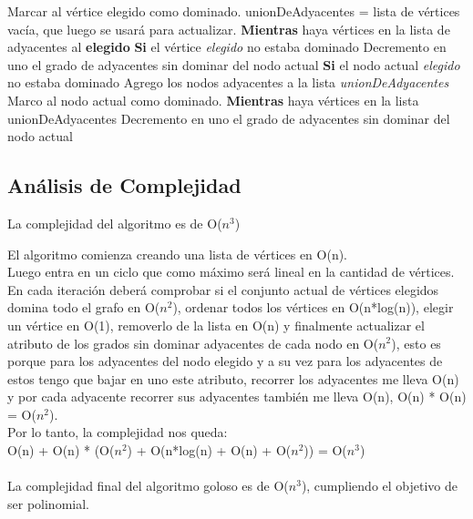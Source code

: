 \begin{codebox}
\li 	Marcar al vértice elegido como dominado.
\li 	unionDeAdyacentes = lista de vértices vacía, que luego se usará para actualizar.
\li 	\textbf{Mientras} haya vértices en la lista de adyacentes al \textbf{elegido} \Do
\li 		\textbf{Si} el vértice \textit{elegido} no estaba dominado \Do
\li 			Decremento en uno el grado de adyacentes sin dominar del nodo actual \End
\li 		\textbf{Si} el nodo actual \textit{elegido} no estaba dominado \Do
\li 			Agrego los nodos adyacentes a la lista \textit{unionDeAdyacentes} \End
\li 		Marco al nodo actual como dominado. \End
\li 	\textbf{Mientras} haya vértices en la lista unionDeAdyacentes \Do 
\li 			Decremento en uno el grado de adyacentes sin dominar del nodo actual \End %
\end{codebox}

\subsection{Análisis de Complejidad}

La complejidad del algoritmo es de O($n^3$)

El algoritmo comienza creando una lista de vértices en O(n).\\
Luego entra en un ciclo que como máximo será lineal en la cantidad de vértices. En cada iteración deberá comprobar si el conjunto actual de vértices elegidos domina todo el grafo en O($n^2$), ordenar todos los vértices en O(n*log(n)), elegir un vértice en O(1), removerlo de la lista en O(n) y finalmente actualizar el atributo de los grados sin dominar adyacentes de cada nodo en O($n^2$), esto es porque para los adyacentes del nodo elegido y a su vez para los adyacentes de estos tengo que bajar en uno este atributo, recorrer los adyacentes me lleva O(n) y por cada adyacente recorrer sus adyacentes también me lleva O(n), O(n) * O(n) = O($n^2$).\\

Por lo tanto, la complejidad nos queda:\\
O(n) + O(n) * (O($n^2$) + O(n*log(n) + O(n) + O($n^2$)) = O($n^3$)\\\\

La complejidad final del algoritmo goloso es de O($n^3$), cumpliendo el objetivo de ser polinomial.


